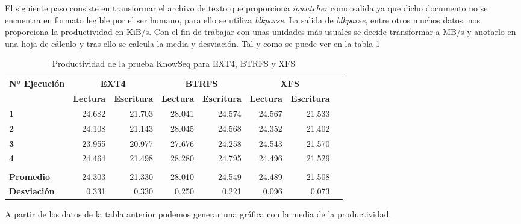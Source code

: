 El siguiente paso consiste en transformar el archivo de texto que proporciona \textit{iowatcher} como salida ya que dicho documento no se encuentra en formato legible por el ser humano, para ello se utiliza \textit{blkparse}. La salida de \textit{blkparse}, entre otros muchos datos, nos proporciona la productividad en KiB/s. Con el fin de trabajar con unas unidades más usuales se decide transformar a MB/s y anotarlo en una hoja de cálculo y tras ello se calcula la media y desviación. Tal y como se puede ver en la tabla \textcolor{magenta}{\ref{tab:pfod_knowseq}}


\begin{table}[H]\centering 
\caption{Productividad de la prueba KnowSeq para EXT4, BTRFS y XFS} 
\label{tab:pfod_knowseq}
\scriptsize
\begin{tabular}{lrrrrrrr}\toprule
\textbf{Nº Ejecución} &\multicolumn{2}{c}{\textbf{EXT4}} &\multicolumn{2}{c}{\textbf{BTRFS}} &\multicolumn{2}{c}{\textbf{XFS}} \\\cmidrule{1-7}
&\textbf{Lectura} &\textbf{Escritura} &\textbf{Lectura} &\textbf{Escritura} &\textbf{Lectura} &\textbf{Escritura} \\\midrule
\textbf{1} &24.682 &21.703 &28.041 &24.574 &24.567 &21.533 \\
\textbf{2} &24.108 &21.143 &28.045 &24.568 &24.352 &21.402 \\
\textbf{3} &23.955 &20.977 &27.676 &24.258 &24.543 &21.570 \\
\textbf{4} &24.464 &21.498 &28.280 &24.795 &24.496 &21.529 \\
\textbf{} & & & & & & \\
\textbf{Promedio} &24.303 &21.330 &28.010 &24.549 &24.489 &21.508 \\
\textbf{Desviación} &0.331 &0.330 &0.250 &0.221 &0.096 &0.073 \\
\bottomrule
\end{tabular}
\end{table}
A partir de los datos de la tabla anterior podemos generar una gráfica con la media de la productividad.

